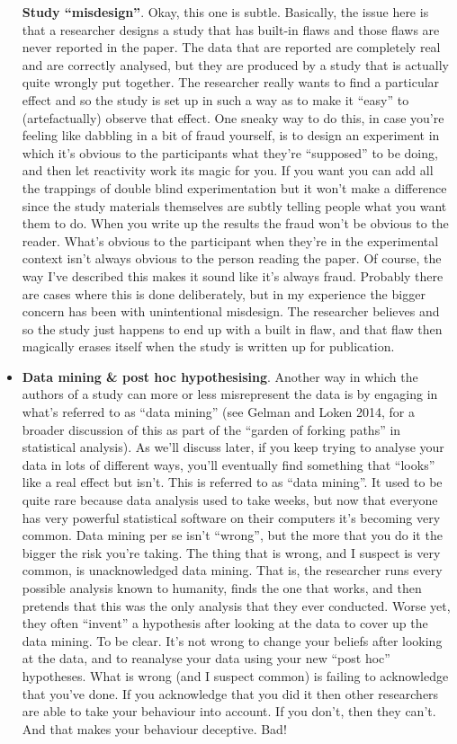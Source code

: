 \documentclass[
]{book}
\begin{document}
\begin{itemize}
  \textbf{Study ``misdesign''}. Okay, this one is subtle. Basically, the issue here is that a researcher designs a study that has built-in flaws and those flaws are never reported in the paper. The data that are reported are completely real and are correctly analysed, but they are produced by a study that is actually quite wrongly put together. The researcher really wants to find a particular effect and so the study is set up in such a way as to make it ``easy'' to (artefactually) observe that effect. One sneaky way to do this, in case you're feeling like dabbling in a bit of fraud yourself, is to design an experiment in which it's obvious to the participants what they're ``supposed'' to be doing, and then let reactivity work its magic for you. If you want you can add all the trappings of double blind experimentation but it won't make a difference since the study materials themselves are subtly telling people what you want them to do. When you write up the results the fraud won't be obvious to the reader. What's obvious to the participant when they're in the experimental context isn't always obvious to the person reading the paper. Of course, the way I've described this makes it sound like it's always fraud. Probably there are cases where this is done deliberately, but in my experience the bigger concern has been with unintentional misdesign. The researcher believes and so the study just happens to end up with a built in flaw, and that flaw then magically erases itself when the study is written up for publication.
\item
  \textbf{Data mining \& post hoc hypothesising}. Another way in which the authors of a study can more or less misrepresent the data is by engaging in what's referred to as ``data mining'' (see Gelman and Loken 2014, for a broader discussion of this as part of the ``garden of forking paths'' in statistical analysis). As we'll discuss later, if you keep trying to analyse your data in lots of different ways, you'll eventually find something that ``looks'' like a real effect but isn't. This is referred to as ``data mining''. It used to be quite rare because data analysis used to take weeks, but now that everyone has very powerful statistical software on their computers it's becoming very common. Data mining per se isn't ``wrong'', but the more that you do it the bigger the risk you're taking. The thing that is wrong, and I suspect is very common, is unacknowledged data mining. That is, the researcher runs every possible analysis known to humanity, finds the one that works, and then pretends that this was the only analysis that they ever conducted. Worse yet, they often ``invent'' a hypothesis after looking at the data to cover up the data mining. To be clear. It's not wrong to change your beliefs after looking at the data, and to reanalyse your data using your new ``post hoc'' hypotheses. What is wrong (and I suspect common) is failing to acknowledge that you've done. If you acknowledge that you did it then other researchers are able to take your behaviour into account. If you don't, then they can't. And that makes your behaviour deceptive. Bad!

\end{itemize}
\end{document}
